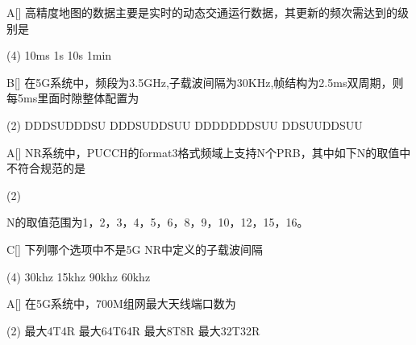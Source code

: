 \begin{choice}{A}[]
    高精度地图的数据主要是实时的动态交通运行数据，其更新的频次需达到的级别是
    \begin{tasks}(4)
        \task 10ms
        \task 1s
        \task 10s
        \task 1min
    \end{tasks}
\end{choice}


\begin{choice}{B}[]
    在5G系统中，频段为3.5GHz,子载波间隔为30KHz,帧结构为2.5ms双周期，则每5ms里面时隙整体配置为
    \begin{tasks}(2)
        \task DDDSUDDDSU
        \task DDDSUDDSUU
        \task DDDDDDDSUU
        \task DDSUUDDSUU
    \end{tasks}
\end{choice}


\begin{choice}{A}[]
    NR系统中，PUCCH的format3格式频域上支持N个PRB，其中如下N的取值中不符合规范的是
    \begin{tasks}(2)
    \end{tasks}
\end{choice}
\begin{solution}
    N的取值范围为{1，2，3，4，5，6，8，9，10，12，15，16}。

\end{solution}
\begin{choice}{C}[]
    下列哪个选项中不是5G NR中定义的子载波间隔
    \begin{tasks}(4)
        \task 30khz
        \task 15khz
        \task 90khz
        \task 60khz
    \end{tasks}
\end{choice}

\begin{choice}{A}[]
    在5G系统中，700M组网最大天线端口数为
    \begin{tasks}(2)
        \task 最大4T4R
        \task 最大64T64R
        \task 最大8T8R
        \task 最大32T32R
    \end{tasks}
\end{choice}




